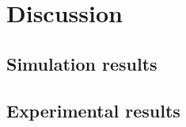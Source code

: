 
\chapter{Discussion}



\section{Simulation results}
\section{Experimental results}

\cleardoublepage